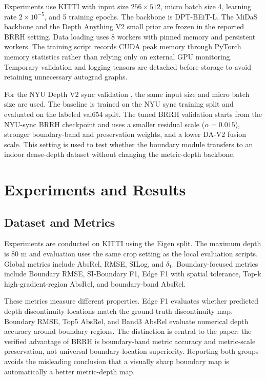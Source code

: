 \documentclass{ieeeaccess}
\begin{document}
Experiments use KITTI \cite{kitti} with input size $256 \times 512$, micro batch size 4, learning rate $2\times10^{-5}$, and 5 training epochs. The backbone is DPT-BEiT-L. The MiDaS backbone and the Depth Anything V2 small prior are frozen in the reported BRRH setting. Data loading uses 8 workers with pinned memory and persistent workers. The training script records CUDA peak memory through PyTorch memory statistics rather than relying only on external GPU monitoring. Temporary validation and logging tensors are detached before storage to avoid retaining unnecessary autograd graphs.

For the NYU Depth V2 sync validation \cite{nyu}, the same input size and micro batch size are used. The baseline is trained on the NYU sync training split and evaluated on the labeled val654 split. The tuned BRRH validation starts from the NYU-sync BRRH checkpoint and uses a smaller residual scale ($\alpha=0.015$), stronger boundary-band and preservation weights, and a lower DA-V2 fusion scale. This setting is used to test whether the boundary module transfers to an indoor dense-depth dataset without changing the metric-depth backbone.

\section{Experiments and Results}

\subsection{Dataset and Metrics}

Experiments are conducted on KITTI using the Eigen split. The maximum depth is 80 m and evaluation uses the same crop setting as the local evaluation scripts. Global metrics include AbsRel, RMSE, SILog, and $\delta_1$. Boundary-focused metrics include Boundary RMSE, SI-Boundary F1, Edge F1 with spatial tolerance, Top-k high-gradient-region AbsRel, and boundary-band AbsRel.

These metrics measure different properties. Edge F1 evaluates whether predicted depth discontinuity locations match the ground-truth discontinuity map. Boundary RMSE, Top5 AbsRel, and Band3 AbsRel evaluate numerical depth accuracy around boundary regions. The distinction is central to the paper: the verified advantage of BRRH is boundary-band metric accuracy and metric-scale preservation, not universal boundary-location superiority. Reporting both groups avoids the misleading conclusion that a visually sharp boundary map is automatically a better metric-depth map.
\end{document}
